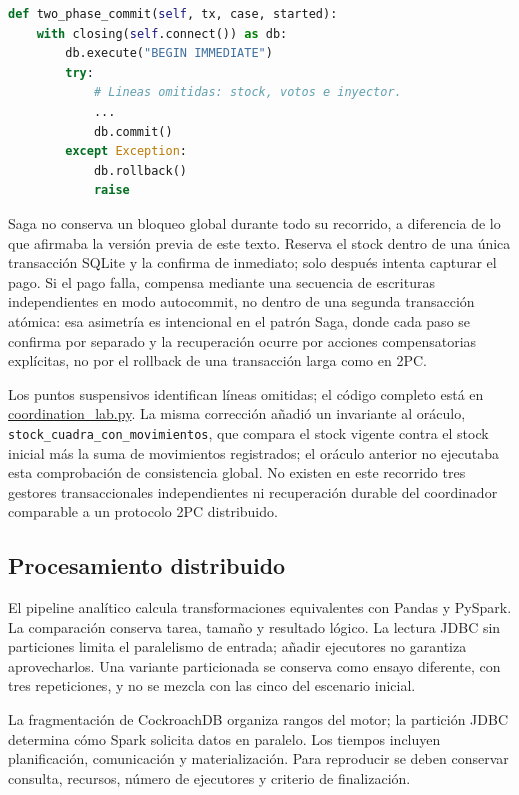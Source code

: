 \documentclass[12pt,a4paper]{article}
\newcommand{\evidencia}[2]{\href{https://github.com/JoseLozanoMorales/TiendaTech/blob/e6680b0290d2c6921ea47116c2df60bd7b055de0/#1}{#2}}
\begin{document}
\begin{minipage}{\linewidth}
\begin{lstlisting}[language=Python,caption={Extracto de E-2PC local: control de escritura delegado en SQLite, sin bloqueo de Python.},label={lst:lab}]
def two_phase_commit(self, tx, case, started):
    with closing(self.connect()) as db:
        db.execute("BEGIN IMMEDIATE")
        try:
            # Lineas omitidas: stock, votos e inyector.
            ...
            db.commit()
        except Exception:
            db.rollback()
            raise
\end{lstlisting}
\end{minipage}
Saga no conserva un bloqueo global durante todo su recorrido, a diferencia de lo que afirmaba la versión previa de este texto. Reserva el stock dentro de una única transacción SQLite y la confirma de inmediato; solo después intenta capturar el pago. Si el pago falla, compensa mediante una secuencia de escrituras independientes en modo autocommit, no dentro de una segunda transacción atómica: esa asimetría es intencional en el patrón Saga, donde cada paso se confirma por separado y la recuperación ocurre por acciones compensatorias explícitas, no por el rollback de una transacción larga como en 2PC.

Los puntos suspensivos identifican líneas omitidas; el código completo está en \evidencia{experiments/paso7/coordination_lab.py}{coordination\_lab.py}. La misma corrección añadió un invariante al oráculo, \texttt{stock\_cuadra\_con\_movimientos}, que compara el stock vigente contra el stock inicial más la suma de movimientos registrados; el oráculo anterior no ejecutaba esta comprobación de consistencia global. No existen en este recorrido tres gestores transaccionales independientes ni recuperación durable del coordinador comparable a un protocolo 2PC distribuido.

\subsection{Procesamiento distribuido}
El pipeline analítico calcula transformaciones equivalentes con Pandas y PySpark. La comparación conserva tarea, tamaño y resultado lógico. La lectura JDBC sin particiones limita el paralelismo de entrada; añadir ejecutores no garantiza aprovecharlos. Una variante particionada se conserva como ensayo diferente, con tres repeticiones, y no se mezcla con las cinco del escenario inicial.

La fragmentación de CockroachDB organiza rangos del motor; la partición JDBC determina cómo Spark solicita datos en paralelo. Los tiempos incluyen planificación, comunicación y materialización. Para reproducir se deben conservar consulta, recursos, número de ejecutores y criterio de finalización.
\end{document}
